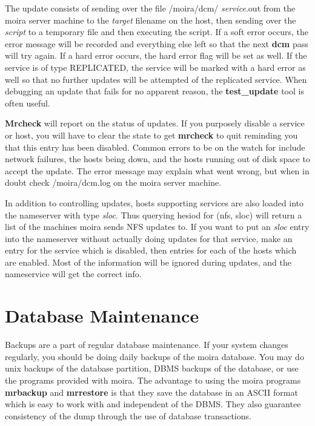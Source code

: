 The update consists of sending over the file /moira/dcm/{\em
service}.out from the moira server machine to the {\em target}
filename on the host, then sending over the {\em script} to a
temporary file and then executing the script.  If a soft error occurs,
the error message will be recorded and everything else left so that
the next {\bf dcm} pass will try again.  If a hard error occurs, the
hard error flag will be set as well.  If the service is of type
REPLICATED, the service will be marked with a hard error as well so
that no further updates will be attempted of the replicated service.
When debugging an update that fails for no apparent reason, the {\bf
test\_update} tool is often useful.

{\bf Mrcheck} will report on the status of updates.  If you purposely
disable a service or host, you will have to clear the state to get
{\bf mrcheck} to quit reminding you that this entry has been disabled.
Common errors to be on the watch for include network failures, the
hosts being down, and the hosts running out of disk space to accept
the update.  The error message may explain what went wrong, but when
in doubt check /moira/dcm.log on the moira server machine.

In addition to controlling updates, hosts supporting services are also
loaded into the nameserver with type {\em sloc}.  Thus querying hesiod
for (nfs, sloc) will return a list of the machines moira sends NFS
updates to.  If you want to put an {\em sloc} entry into the nameserver
without actually doing updates for that service, make an entry for the
service which is disabled, then entries for each of the hosts which
are enabled.  Most of the information will be ignored during updates,
and the nameservice will get the correct info.


\section{Database Maintenance}

Backups are a part of regular database maintenance.  If your system
changes regularly, you should be doing daily backups of the moira
database.  You may do {\sc unix} backups of the database partition, DBMS
backups of the database, or use the programs provided with moira.  The
advantage to using the moira programs {\bf mrbackup} and {\bf mrrestore}
is that they save the database in an ASCII format which is easy to
work with and independent of the DBMS.  They also guarantee
consistency of the dump through the use of database transactions.

